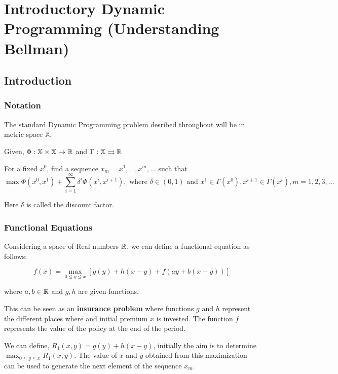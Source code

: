 
\section{Introductory Dynamic Programming (Understanding Bellman)}

\subsection{Introduction}
\subsubsection{Notation}

The standard Dynamic Programming problem desribed throughout will be in metric space $\mathbb{X}$.

Given, $\Phi: \mathbb{X} \times \mathbb{X} \to \mathbb{R}$ and $\Gamma: \mathbb{X} \rightrightarrows \mathbb{R}$

For a fixed $x^0$, find a sequence ${x_m} = {x^1, ..., x^m, ...}$ such that
$$
\max \Phi(x^0, x^1) + \sum_{i=1}^{\infty}\delta^i \Phi(x^i, x^{i+1}), \text{ where } \delta \in (0,1) \text{ and } x^1 \in \Gamma(x^0), x^{i+1} \in \Gamma(x^i), m = 1,2,3,...
$$

Here $\delta$ is called the discount factor.

\subsubsection{Functional Equations}

Considering a space of Real numbers $\mathbb{R}$, we can define a functional equation as follows:

$$
f(x) = \max_{0 \le y \le x} [g(y) + h(x-y) + f(ay+b(x-y))]
$$

where $a,b \in \mathbb{R}$ and $g,h$ are given functions.

This can be seen as an \textbf{insurance problem} where functions $g$ and $h$ represent the different places where and initial premium $x$ is invested. The function $f$ represents the value of the policy at the end of the period.

\vspace{5mm}
We can define, $R_1(x, y) = g(y) + h(x-y)$, initially the aim is to determine $\max_{0 \le y \le x} R_1(x, y)$. The value of $x$ and $y$ obtained from this maximization can be used to generate the next element of the sequence $x_m$.


